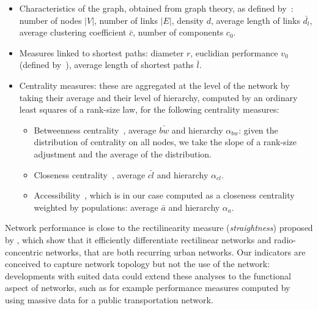 \begin{itemize}
\item Characteristics of the graph, obtained from graph theory, as defined by~\cite{haggett1970network}: number of nodes $\left|V\right|$, number of links $\left|E\right|$, density $d$, average length of links $\bar{d_l}$, average clustering coefficient $\bar{c}$, number of components $c_0$.
\item Measures linked to shortest paths: diameter $r$, euclidian performance $v_0$ (defined by~\cite{banos2012towards}), average length of shortest paths $\bar{l}$.
\item Centrality measures: these are aggregated at the level of the network by taking their average and their level of hierarchy, computed by an ordinary least squares of a rank-size law, for the following centrality measures:
\begin{itemize}
\item Betweenness centrality~\citep{crucitti2006centrality}, average $\bar{bw}$ and hierarchy $\alpha_{bw}$: given the distribution of centrality on all nodes, we take the slope of a rank-size adjustment and the average of the distribution.
\item Closeness centrality~\citep{crucitti2006centrality}, average $\bar{cl}$ and hierarchy $\alpha_{cl}$.
\item Accessibility~\citep{hansen1959accessibility}, which is in our case computed as a closeness centrality weighted by populations: average $\bar{a}$ and hierarchy $\alpha_{a}$.
\end{itemize}
\end{itemize}

Network performance is close to the rectilinearity measure (\emph{straightness}) proposed by \cite{josselin2016straightness}, which show that it efficiently differentiate rectilinear networks and radio-concentric networks, that are both recurring urban networks. Our indicators are conceived to capture network topology but not the use of the network: developments with suited data could extend these analyses to the functional aspect of networks, such as for example performance measures computed by~\cite{trepanier2009calculation} using massive data for a public transportation network.




